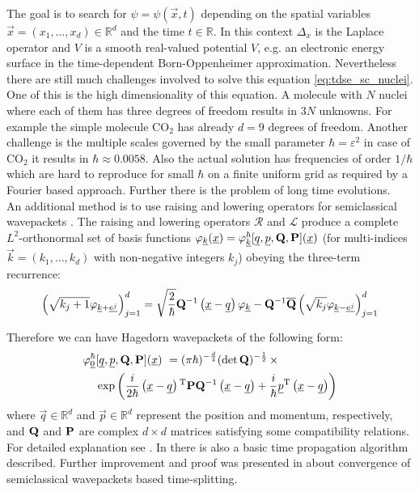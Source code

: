 The goal is to search for $\psi = \psi(\vec{x},t)$ depending on the spatial variables $\vec{x} = (x_{1},\ldots,x_{d}) \in \mathbb{R}^{d}$ and the time $t\in \mathbb{R}$. In this context $\Delta_{x}$ is the Laplace operator and $V$ is a smooth real-valued potential $V$, e.g. an electronic energy surface in the time-dependent Born-Oppenheimer approximation. Nevertheless there are still much challenges involved to solve this equation \ref{eq:tdse_sc_nuclei}. One of this is the high dimensionality of this equation. A molecule with $N$ nuclei where each of them has three degrees of freedom results in $3N$ unknowns. For example the simple molecule $\mathrm{CO_{2}}$ has already $d=9$ degrees of freedom. Another challenge is the multiple scales governed by the small parameter $\hbar = \varepsilon^{2}$ in case of $\mathrm{CO_{2}}$ it results in $\hbar \approx 0.0058$. Also the actual solution has frequencies of order $1/\hbar$ which are hard to reproduce for small $\hbar$ on a finite uniform grid as required by a Fourier based approach. Further there is the problem of long time evolutions.\\

An additional method is to use raising and lowering operators for semiclassical wavepackets \cite{H_ladder_operators}. The raising and lowering operators $\mathcal{R}$ and $\mathcal{L}$ produce a complete $L^2$-orthonormal set of basis functions $\varphi_{\underline{k}}(\underline{x}) = \varphi_{\underline{k}}^\hbar[\underline{q},\underline{p},\mathbf{Q},\mathbf{P}](\underline{x})$ (for multi-indices $\vec{k} = (k_1,\dots,k_d)$ with non-negative integers $k_j$) obeying the three-term recurrence:
\begin{equation*}
          \left(\sqrt{k_{j}+1}\varphi_{\underline{k}+\underline{e^j}}\right)_{j=1}^{d}
          = \sqrt{\frac{2}{\hbar}} \mathbf{Q}{}^{-1} \left(\underline{x}-\underline{q}\right) \varphi_{\underline{k}} -
          \mathbf{Q}{}^{-1} \overline{\mathbf{Q}} \left(\sqrt{k_{j}} \varphi_{\underline{k}-\underline{e^j}}\right)_{j=1}^{d}
\end{equation*}

Therefore we can have Hagedorn wavepackets of the following form:
        \begin{equation*}
          \begin{split}
            \varphi_{\underline{0}}^\hbar & [\underline{q},\underline{p},\mathbf{Q},\mathbf{P}](\underline{x})\ =
            (\pi\hbar)^{-\frac{d}{4}} (\det \mathbf{Q})^{-\frac{1}{2}} \,\times \\
            & \exp\left(\frac{i}{2\hbar} \left(\underline{x}-\underline{q}\right){}^{\textnormal{T}} \mathbf{P}\mathbf{Q}{}^{-1} \left(\underline{x}-\underline{q}\right) +
              \frac{i}{\hbar} \underline{p}{}^{\textnormal{T}} \left(\underline{x}-\underline{q}\right) \right)
          \end{split}
        \end{equation*}
where $\vec{q}\in \mathbb{R}^d$ and $\vec{p}\in \mathbb{R}^d$ represent the position and momentum, respectively, and $\mathbf{Q}$ and $\mathbf{P}$ are complex $d\times d$ matrices satisfying some compatibility relations. For detailed explanation see \cite{FGL_semiclassical_dynamics}. In there is also a basic time propagation algorithm described. Further improvement and proof was presented in \cite{GH_convsemiclassical} about convergence of semiclassical wavepackets based time-splitting.\\

